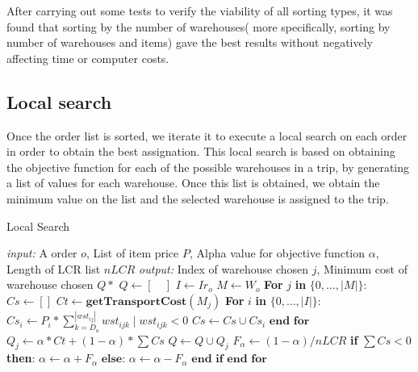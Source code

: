 \documentclass[letterpaper]{article} %
\begin{document}
After carrying out some tests to verify the viability of all sorting types, it was found that sorting by the number of warehouses( more specifically, sorting by number of warehouses and items) gave the best results without negatively affecting time or computer costs.

\subsection*{Local search}

Once the order list is sorted, we iterate it to execute a local search on each order in order to obtain the best assignation. This local search is based on obtaining the objective function for each of the possible warehouses in a trip, by generating a list of values for each warehouse. Once this list is obtained, we obtain the minimum value on the list and the selected warehouse is assigned to the trip.

\begin{algorithm}[H] \label{code:LocalSearch}
    \caption{Local Search}
    \begin{algorithmic}[1]
        \STATE \textit{input: } A order $o$, List of item price $P$, Alpha value for objective function $\alpha$, Length of LCR list $nLCR$
        \STATE \textit{output: } Index of warehouse chosen $j$, Minimum cost of warehouse chosen $Q*$
        \STATE  $Q \longleftarrow [\quad]$
        \STATE  $I \longleftarrow Ir_{o}$
        \STATE  $M \longleftarrow W_{o}$
        \STATE  \textbf{For} $j$ \textbf{in} $\{ 0,\dots,|M|\}$:
        \STATE  \quad $Cs \longleftarrow []$
        \STATE  \quad $Ct \longleftarrow \textbf{getTransportCost}(M_j) $ \label{eq:ct}
        \STATE  \quad \textbf{For} $i$ \textbf{in} $\{ 0,\dots,|I|\}$:
        \STATE  \quad \quad $Cs_i \longleftarrow P_i * \sum_{k=D_{o}}^{|wst_{ij}|} wst_{ijk}\; |\; wst_{ijk} < 0 $ 
        \STATE  \quad \quad$Cs \longleftarrow Cs \cup Cs_i $ \label{eq:cs}
        \STATE  \quad  $\textbf{end for}$
        \STATE  \quad $Q_j \longleftarrow \alpha * Ct + (1 - \alpha) * \sum Cs$ \label{eq:fitness}
        \STATE  \quad $Q \longleftarrow Q \cup Q_j$ \label{eq:fitness}
        \STATE  \quad $F_{\alpha}  \longleftarrow (1-\alpha) / nLCR$ \label{eq:fitness}
        \STATE  \quad \textbf{if} $\sum Cs < 0$ \textbf{then}:
        \STATE  \quad \quad $\alpha \longleftarrow \alpha + F_{\alpha}$
        \STATE  \quad $\textbf{else:}$
        \STATE  \quad \quad $\alpha \longleftarrow \alpha - F_{\alpha}$
        \STATE  \quad $\textbf{end if}$
        \STATE  $\textbf{end for}$
    \end{algorithmic}
\end{algorithm}
\end{document}
